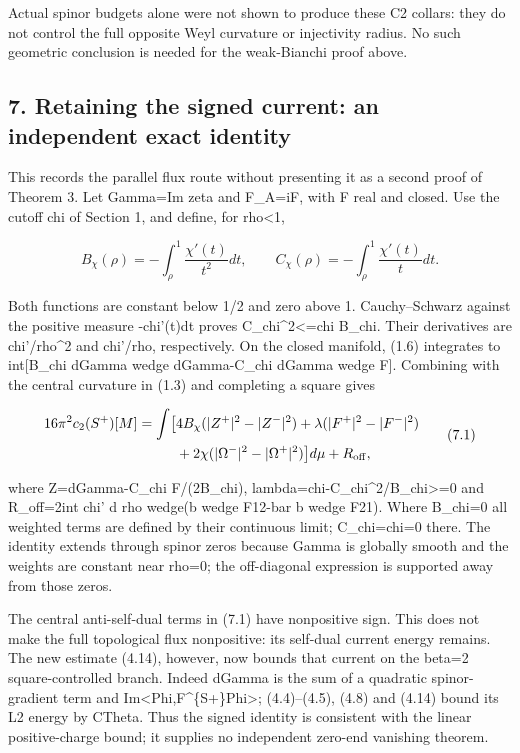 \documentclass[
  10pt,
]{article}
\begin{document}
Actual spinor budgets alone were not shown to produce these C2 collars:
they do not control the full opposite Weyl curvature or injectivity
radius. No such geometric conclusion is needed for the weak-Bianchi
proof above.

\hypertarget{retaining-the-signed-current-an-independent-exact-identity}{%
\subsection{7. Retaining the signed current: an independent exact
identity}\label{retaining-the-signed-current-an-independent-exact-identity}}

This records the parallel flux route without presenting it as a second
proof of Theorem 3. Let Gamma=Im zeta and F\_A=iF, with F real and
closed. Use the cutoff chi of Section 1, and define, for rho\textless1,

\[
 B_\chi(\rho)=-\int_\rho^1\frac{\chi'(t)}{t^2}dt,
 \qquad C_\chi(\rho)=-\int_\rho^1\frac{\chi'(t)}t dt.
\]

Both functions are constant below 1/2 and zero above 1. Cauchy--Schwarz
against the positive measure -chi'(t)dt proves C\_chi\^{}2\textless=chi
B\_chi. Their derivatives are chi'/rho\^{}2 and chi'/rho, respectively.
On the closed manifold, (1.6) integrates to int{[}B\_chi dGamma wedge
dGamma-C\_chi dGamma wedge F{]}. Combining with the central curvature in
(1.3) and completing a square gives

\[
\begin{aligned}
16\pi^2c_2(S^+)[M]=\int\bigl[&4B_\chi(|Z^+|^2-|Z^-|^2)
 +\lambda(|F^+|^2-|F^-|^2)\\
 &+2\chi(|\Omega^-|^2-|\Omega^+|^2)\bigr]d\mu+R_{\rm off},
\end{aligned}                                                     \tag{7.1}
\]

where Z=dGamma-C\_chi F/(2B\_chi),
lambda=chi-C\_chi\^{}2/B\_chi\textgreater=0 and R\_off=2int chi' d rho
wedge(b wedge F12-bar b wedge F21). Where B\_chi=0 all weighted terms
are defined by their continuous limit; C\_chi=chi=0 there. The identity
extends through spinor zeros because Gamma is globally smooth and the
weights are constant near rho=0; the off-diagonal expression is
supported away from those zeros.

The central anti-self-dual terms in (7.1) have nonpositive sign. This
does not make the full topological flux nonpositive: its self-dual
current energy remains. The new estimate (4.14), however, now bounds
that current on the beta=2 square-controlled branch. Indeed dGamma is
the sum of a quadratic spinor-gradient term and
Im\textless Phi,F\^{}\{S+\}Phi\textgreater; (4.4)--(4.5), (4.8) and
(4.14) bound its L2 energy by CTheta. Thus the signed identity is
consistent with the linear positive-charge bound; it supplies no
independent zero-end vanishing theorem.
\end{document}
